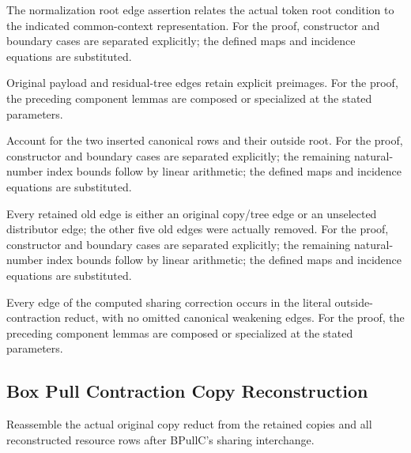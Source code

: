 The normalization root edge assertion relates the actual token root condition to the indicated common-context representation.
For the proof, constructor and boundary cases are separated explicitly; the defined maps and incidence equations are substituted.
\par{}

Original payload and residual-tree edges retain explicit preimages.
For the proof, the preceding component lemmas are composed or specialized at the stated parameters.
\par{}

Account for the two inserted canonical rows and their outside root.
For the proof, constructor and boundary cases are separated explicitly; the remaining natural-number index bounds follow by linear arithmetic; the defined maps and incidence equations are substituted.
\par{}

Every retained old edge is either an original copy/tree edge or an unselected distributor edge; the other five old edges were actually removed.
For the proof, constructor and boundary cases are separated explicitly; the remaining natural-number index bounds follow by linear arithmetic; the defined maps and incidence equations are substituted.
\par{}

Every edge of the computed sharing correction occurs in the literal outside-contraction reduct, with no omitted canonical weakening edges.
For the proof, the preceding component lemmas are composed or specialized at the stated parameters.
\par{}

\subsection{Box Pull Contraction Copy Reconstruction}
Reassemble the actual original copy reduct from the retained copies and all reconstructed resource rows after BPullC's sharing interchange.

